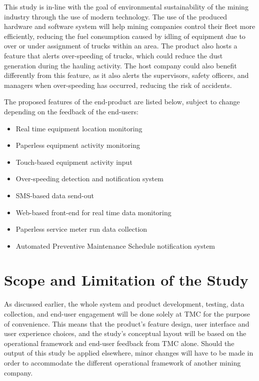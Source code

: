 \documentclass[12pt]{report}
\begin{document}
This study is in-line with the goal of environmental sustainability of the mining industry through the use of modern technology.
The use of the produced hardware and software system will help mining companies control their fleet more efficiently, reducing the fuel consumption caused by idling of equipment due to over or under assignment of trucks within an area.
The product also hosts a feature that alerts over-speeding of trucks, which could reduce the dust generation during the hauling activity. 
The host company could also benefit differently from this feature, as it also alerts the supervisors, safety officers, and managers when over-speeding has occurred, reducing the risk of accidents.

The proposed features of the end-product are listed below, subject to change depending on the feedback of the end-users:
\begin{itemize}
\setlength\itemsep{-0.1em}
    \item Real time equipment location monitoring
    \item Paperless equipment activity monitoring
    \item Touch-based equipment activity input
    \item Over-speeding detection and notification system
    \item SMS-based data send-out
    \item Web-based front-end for real time data monitoring
    \item Paperless service meter run data collection
    \item Automated Preventive Maintenance Schedule notification system
\end{itemize}

\section{Scope and Limitation of the Study}

As discussed earlier, the whole system and product development, testing, data collection, and end-user engagement will be done solely at TMC for the purpose of convenience.
This means that the product's feature design, user interface and user experience choices, and the study's conceptual layout will be based on the operational framework and end-user feedback from TMC alone.
Should the output of this study be applied elsewhere, minor changes will have to be made in order to accommodate the different operational framework of another mining company.
\end{document}
